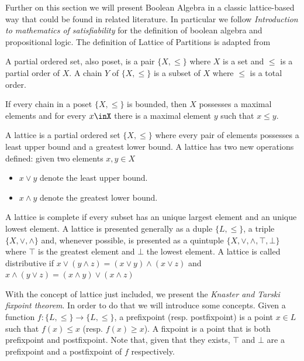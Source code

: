Further on this section we will present Boolean Algebra in a classic lattice-based way that could be found in related literature. In particular we follow  \emph{Introduction to mathematics of satisfiability}\cite{marek2009introduction} for the definition of boolean algebra and propositional logic. The definition of Lattice of Partitions is adapted from \cite{sakallah2009symmetry}

\begin{definition}
  A partial ordered set, also poset, is a pair $\{X, \le\}$ where $X$ is a set and $\le$ is a partial order of $X$. A chain $Y$ of $\{X, \le\}$ is a subset of $X$ where $\le$ is a total order. 
\end{definition}

\begin{theorem}
  If every chain in a poset $\{X,\le\}$ is bounded, then $X$ possesses a maximal elements and for every $x\inX$ there is a maximal element $y$ such that $x\le y$.
\end{theorem}



\begin{definition} A lattice is a partial ordered set 
$ \{X,\le\} $ where every pair of elements possesses a least upper bound and a greatest lower bound. A lattice has two new operations defined: given two elements $x,y\in X$
  \begin{itemize}
  \item $x\vee y$ denote the least upper bound.
  \item $x\wedge y$  denote the greatest lower bound.
  \end{itemize}
\end{definition}


  A lattice is complete if every subset has an unique largest element and an unique lowest element. A lattice is presented generally as a duple $\{L,\le\}$, a triple $\{X,\vee,\wedge\}$ and, whenever possible, is presented as a quintuple $\{X, \vee, \wedge, \top,\bot\}$ where $\top$ is the greatest element and $\bot$ the lowest element. A lattice is called distributive if $x\vee(y \wedge z) = (x\vee y) \wedge (x \vee z)$ and $x\wedge(y \vee z) = (x\wedge y) \vee (x \wedge z)$



With the concept of lattice just included, we present the \emph{Knaster and Tarski fixpoint theorem}. In order to do that we will introduce some concepts. Given a function $f:\{L,\le\}\to \{L,\le\}$, a prefixpoint (resp. postfixpoint) is a point $x \in L$ such that $f(x) \le x$ (resp. $f(x) \ge x$). A fixpoint is a point that is both prefixpoint and postfixpoint. Note that, given that they exists, $\top$ and $\bot$ are a prefixpoint and a postfixpoint of $f$ respectively.

